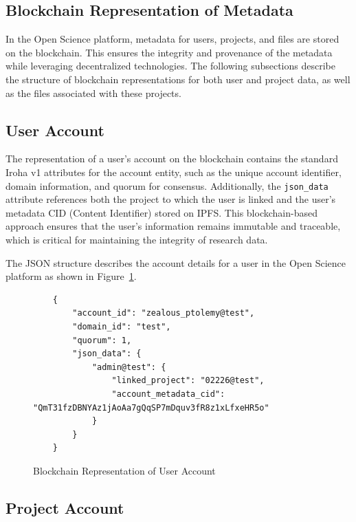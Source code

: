 \documentclass{article}
\begin{document}
\subsection{Blockchain Representation of Metadata}

In the Open Science platform, metadata for users, projects, and files are stored on the blockchain. This ensures the integrity and provenance of the metadata while leveraging decentralized technologies. The following subsections describe the structure of blockchain representations for both user and project data, as well as the files associated with these projects.

\subsection{User Account}

The representation of a user's account on the blockchain contains the standard Iroha v1 attributes for the account entity, such as the unique account identifier, domain information, and quorum for consensus. Additionally, the \texttt{json\_data} attribute references both the project to which the user is linked and the user's metadata CID (Content Identifier) stored on IPFS. This blockchain-based approach ensures that the user’s information remains immutable and traceable, which is critical for maintaining the integrity of research data.

The JSON structure describes the account details for a user in the Open Science platform as shown in Figure~\ref{fig:user_blockchain_representation}.

\begin{figure}[h]
      \centering
      \caption{Blockchain Representation of User Account}
      \label{fig:user_blockchain_representation}
      \begin{verbatim}
    {
        "account_id": "zealous_ptolemy@test",
        "domain_id": "test",
        "quorum": 1,
        "json_data": {
            "admin@test": {
                "linked_project": "02226@test",
                "account_metadata_cid": "QmT31fzDBNYAz1jAoAa7gQqSP7mDquv3fR8z1xLfxeHR5o"
            }
        }
    }
    \end{verbatim}
\end{figure}

\subsection{Project Account}
\end{document}
